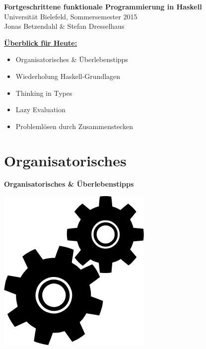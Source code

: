 \documentclass[unknownkeysallowed]{beamer}
\begin{document}
 
  

  \begin{frame}
    \huge\textbf{Fortgeschrittene funktionale Programmierung in Haskell}\\ \bigskip
    \LARGE Universität Bielefeld, Sommersemester 2015\\ \bigskip
    \large Jonas Betzendahl \& Stefan Dresselhaus
  \end{frame}

  
\begin{frame}
	\Large\textbf{\underline{Überblick für Heute:}}\bigskip \normalsize
	
	\begin{itemize}
	\item Organisatorisches \& Überlebenstipps
	\item Wiederholung Haskell-Grundlagen
	\item Thinking in Types
	\item Lazy Evaluation
	\item Problemlösen durch Zusammenstecken
	\end{itemize}

\end{frame}

  \section{Organisatorisches}
  
  \begin{frame}

    \begin{center}
    \Large\textbf{Organisatorisches \& Überlebenstipps} \bigskip
    
    \includegraphics[scale=0.3]{Noun-project-1063.png} 
    \end{center}
  \end{frame}
\end{document}
